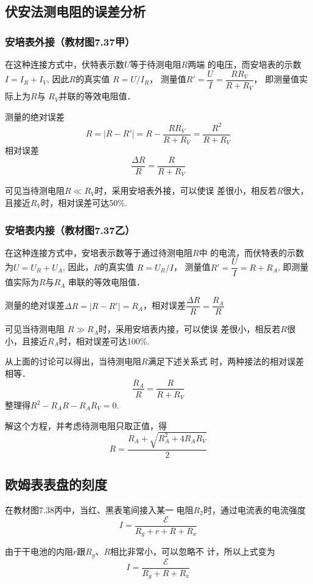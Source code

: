 \subsection{伏安法测电阻的误差分析}
\subsubsection{安培表外接（教材图7.37甲）}
在这种连接方式中，伏特表示数$U$等于待测电阻$R$两端
的电压，而安培表的示数$I=I_R+I_V$, 因此$R$的真实值
$R=U/I_R$，
测量值$R'=\dfrac{U}{I}=\dfrac{RR_V}{R+R_V}$，
即测量值实际上为$R$与
$R_V$并联的等效电阻值．

测量的绝对误差
\[R=|R-R'|=R-\dfrac{RR_V}{R+R_V}=\dfrac{R^2}{R+R_V}\]
相对误差
\[\frac{\Delta R}{R}=\frac{R}{R+R_V}\]

可见当待测电阻$R\ll R_V$时，采用安培表外接，可以使误
差很小，相反若$R$很大，且接近$R_V$时，相对误差可达50\%.

\subsubsection{安培表内接（教材图7.37乙）}
在这种连接方式中，安培表示数等于通过待测电阻$R$中
的电流，而伏特表的示数为$U=U_R+U_A$, 因此，$R$的真实值
$R=U_R/I$，
测量值$R'=\dfrac{U}{I}=R+R_A$, 即测量值实际为$R$与$R_A$
串联的等效电阻值．

测量的绝对误差$\Delta R=|R-R'|=R_A$，相对误差$\dfrac{\Delta R}{R}=\dfrac{R_A}{R}$

可见当待测电阻 $R\gg R_A$时，采用安培表内接，可以使误
差很小，相反若$R$很小，且接近$R_A$时，相对误差可达100\%.

从上面的讨论可以得出，当待测电阻$R$满足下述关系式
时，两种接法的相对误差相等．
\[\frac{R_A}{R}=\frac{R}{R+R_V}\]
整理得$R^2-R_AR-R_AR_V=0$.

解这个方程，并考虑待测电阻只取正值，得
\[R=\frac{R_A+\sqrt{R^2_A+4R_AR_V}}{2}\]

\subsection{欧姆表表盘的刻度}

在教材图7.38丙中，当红、黑表笔间接入某一
电阻$R_2$时，通过电流表的电流强度
\[I=\frac{\mathcal{E}}{R_g+r+R+R_x}\]

由于干电池的内阻$r$跟$R_g$、$R$相比非常小，可以忽略不
计，所以上式变为
\begin{equation}
    I=\frac{\mathcal{E}}{R_g+R+R_x}
\end{equation}

